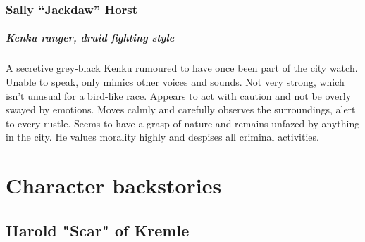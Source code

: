 \documentclass[10pt,onecolumn,twoside,openany,bg=full,layout=true]{dndbook}
\begin{document}
  \subsection{Sally “Jackdaw” Horst}\label{subsec:sally-jackdaw-horst}

  \paragraph{Kenku ranger, druid fighting style}
  A secretive grey-black Kenku rumoured to have once been part of the city watch.
  Unable to speak, only mimics other voices and sounds.
  Not very strong, which isn't unusual for a bird-like race.
  Appears to act with caution and not be overly swayed by emotions.
  Moves calmly and carefully observes the surroundings, alert to every rustle.
  Seems to have a grasp of nature and remains unfazed by anything in the city.
  He values morality highly and despises all criminal activities.

\vfill


\chapter{Character backstories}\label{ch:character-backstories}
\section{Harold "Scar" of Kremle}\label{sec:harold-"scar"-of-kremle}
\end{document}
